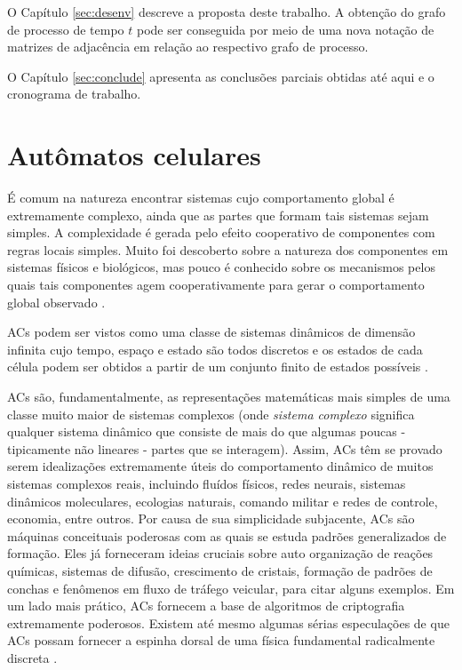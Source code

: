 \documentclass[12pt,a4paper]{article}
\begin{document}
O Capítulo \ref{sec:desenv} descreve a proposta deste trabalho. A obtenção do
grafo de processo de tempo $t$ pode ser conseguida por meio de uma nova notação de 
matrizes de adjacência em relação ao respectivo grafo de processo.

O Capítulo \ref{sec:conclude} apresenta as conclusões parciais obtidas até
aqui e o cronograma de trabalho.

\newpage

\section{Autômatos celulares}\label{sec:refteo}

É comum na natureza encontrar sistemas cujo comportamento global é extremamente
complexo, ainda que as partes que formam tais sistemas sejam simples. A
complexidade é gerada pelo efeito cooperativo de componentes com regras locais
simples. Muito foi descoberto sobre a natureza dos componentes em sistemas físicos
e biológicos, mas pouco é conhecido sobre os mecanismos pelos quais tais componentes
agem cooperativamente para gerar o comportamento global observado .

ACs podem ser vistos como uma classe de sistemas dinâmicos de dimensão
infinita cujo tempo, espaço e estado são todos discretos e os estados de cada célula
podem ser obtidos a partir de um conjunto finito de estados possíveis . 

ACs são, fundamentalmente, as representações matemáticas mais simples
de uma classe muito maior de sistemas complexos (onde \textit{sistema complexo} significa
qualquer sistema dinâmico que consiste de mais do que algumas poucas - tipicamente
não lineares - partes que se interagem). Assim, ACs têm se provado
serem idealizações extremamente úteis do comportamento dinâmico de muitos sistemas
complexos reais, incluindo fluídos físicos, redes neurais, sistemas dinâmicos
moleculares, ecologias naturais, comando militar e redes de controle, economia, entre
outros. Por causa de sua simplicidade subjacente, ACs são máquinas
conceituais poderosas com as quais se estuda padrões generalizados de formação. Eles
já forneceram ideias cruciais sobre auto organização de reações químicas, sistemas de
difusão, crescimento de cristais, formação de padrões de conchas e fenômenos em fluxo
de tráfego veicular, para citar alguns exemplos. Em um lado mais prático, ACs
fornecem a base de algoritmos de criptografia extremamente poderosos. Existem
até mesmo algumas sérias especulações de que ACs possam fornecer
a espinha dorsal de uma física fundamental radicalmente discreta .
\end{document}
